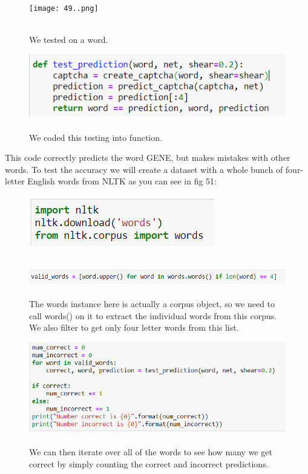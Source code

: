 \documentclass[onecolumn]{article}
\begin{document}
\newpage
\begin{figure}[h]   
    \centering
    \texttt{[image: 49..png]}
\caption{\label{fig:demo-bad}
\centering
\\We tested on a word. }
\end{figure}

\begin{figure}[h]
    \centering
    \includegraphics[width=.7\linewidth]{50..png}
\caption{\label{fig:demo-bad}
\centering
\\We coded this testing into function. }
\end{figure}

\begin{t}
This code correctly predicts the word GENE, but makes mistakes with other words. To test the accuracy we will create a dataset with a whole bunch of four-letter English words from NLTK as you can see in fig 51:
\end{t}

\begin{figure}[h]
    \centering
    \includegraphics[width=.5\linewidth]{51..png}
\caption{\label{fig:demo-bad}
\\ }
\end{figure}

\begin{figure}[hb!]
    \centering
    \includegraphics[width=.9\linewidth]{52..png}
\caption{\label{fig:demo-bad}
\centering
\\The words instance here is actually a corpus object, so we need to call words() on it
to extract the individual words from this corpus. We also filter to get only four letter
words from this list. }
\end{figure}

\newpage
\begin{figure}[hb!]
    \centering
    \includegraphics[width=.8\linewidth]{53..png}
\caption{\label{fig:demo-bad}
\centering
\\We can then iterate over all of the words to see how many we get correct by simply
counting the correct and incorrect predictions. }
\end{figure}
\end{document}

